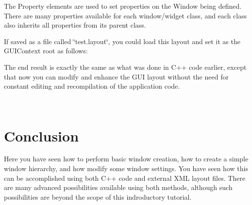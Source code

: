 The Property elements are used to set properties on the Window being defined. There are many properties available for each window/widget class, and each class also inherits all properties from it\textquotesingle{}s parent class.

If saved as a file called \char`\"{}test.\+layout\char`\"{}, you could load this layout and set it as the G\+U\+I\+Context root as follows\+: 
\begin{DoxyCode}{0}
\end{DoxyCode}


The end result is exactly the same as what was done in C++ code earlier, except that now you can modify and enhance the G\+UI layout without the need for constant editing and recompilation of the application code.

~\newline
 \hypertarget{window_tutorial_window_tutorial_conclusion}{}\section{Conclusion}\label{window_tutorial_window_tutorial_conclusion}
Here you have seen how to perform basic window creation, how to create a simple window hierarchy, and how modify some window settings. You have seen how this can be accomplished using both C++ code and external X\+ML layout files. There are many advanced possibilities available using both methods, although such possibilities are beyond the scope of this indroductory tutorial. 